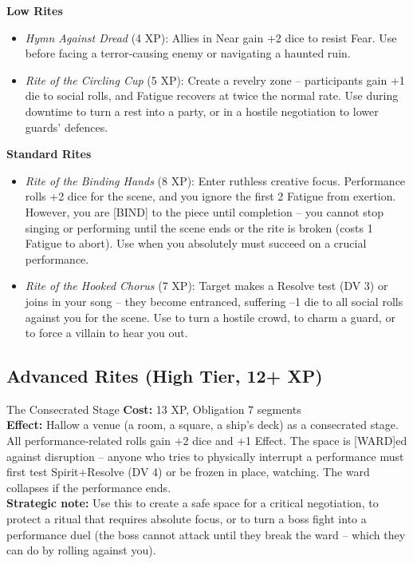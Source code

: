 \documentclass[10pt,a5paper]{book}
\begin{document}
\textbf{Low Rites}
\begin{itemize}
    \item \textit{Hymn Against Dread} (4 XP): Allies in Near gain +2 dice to resist Fear. Use before facing a terror‑causing enemy or navigating a haunted ruin.
    \item \textit{Rite of the Circling Cup} (5 XP): Create a revelry zone – participants gain +1 die to social rolls, and Fatigue recovers at twice the normal rate. Use during downtime to turn a rest into a party, or in a hostile negotiation to lower guards’ defences.
\end{itemize}

\textbf{Standard Rites}
\begin{itemize}
    \item \textit{Rite of the Binding Hands} (8 XP): Enter ruthless creative focus. Performance rolls +2 dice for the scene, and you ignore the first 2 Fatigue from exertion. However, you are [BIND] to the piece until completion – you cannot stop singing or performing until the scene ends or the rite is broken (costs 1 Fatigue to abort). Use when you absolutely must succeed on a crucial performance.
    \item \textit{Rite of the Hooked Chorus} (7 XP): Target makes a Resolve test (DV 3) or joins in your song – they become entranced, suffering –1 die to all social rolls against you for the scene. Use to turn a hostile crowd, to charm a guard, or to force a villain to hear you out.
\end{itemize}

\subsection*{Advanced Rites (High Tier, 12+ XP)}

\begin{patronbox}{The Consecrated Stage}
\textbf{Cost:} 13 XP, Obligation 7 segments \\
\textbf{Effect:} Hallow a venue (a room, a square, a ship’s deck) as a consecrated stage. All performance‑related rolls gain +2 dice and +1 Effect. The space is [WARD]ed against disruption – anyone who tries to physically interrupt a performance must first test Spirit+Resolve (DV 4) or be frozen in place, watching. The ward collapses if the performance ends. \\
\textbf{Strategic note:} Use this to create a safe space for a critical negotiation, to protect a ritual that requires absolute focus, or to turn a boss fight into a performance duel (the boss cannot attack until they break the ward – which they can do by rolling against you).
\end{patronbox}
\end{document}
